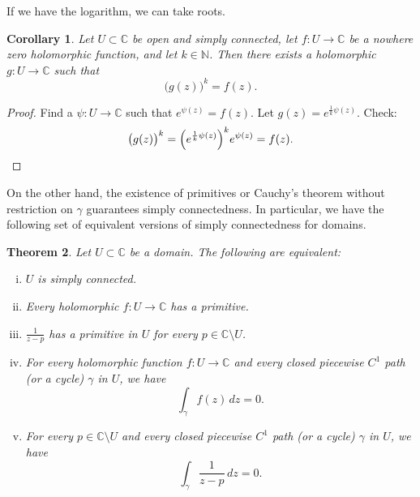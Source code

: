 \documentclass[12pt,openany]{book}
\newcommand{\C}{{\mathbb{C}}}
\newcommand{\N}{{\mathbb{N}}}
\theoremstyle{plain}
\newtheorem{thm}{Theorem}[section]
\newtheorem{cor}[thm]{Corollary}
\theoremstyle{remark}
\theoremstyle{definition}
\theoremstyle{exercise}
\theoremstyle{example}
\begin{document}
If we have the logarithm, we can take roots.

\begin{cor}
Let $U \subset \C$ be open and simply connected,
let $f \colon U \to \C$ be a nowhere zero holomorphic
function, and let $k \in \N$.
Then there exists a holomorphic $g \colon U \to \C$
such that
\begin{equation*}
{\bigl(g(z)\bigr)}^k = f(z) .
\end{equation*}
\end{cor}

\begin{proof}
Find a $\psi \colon U \to \C$ such that $e^{\psi(z)} = f(z)$.  Let
$g(z) = e^{\frac{1}{k} \psi(z)}$.  Check:
\begin{equation*}
{\bigl(g(z)\bigr)}^k
=
{\left( e^{\frac{1}{k} \psi(z)} \right)}^k
e^{\psi(z)} = f(z) . \qedhere
\end{equation*}
\end{proof}

On the other hand, the existence of primitives or
Cauchy's theorem without restriction on $\gamma$ guarantees simply
connectedness.  In particular, we have the following set of equivalent
versions of simply connectedness for domains.

\begin{thm}
Let $U \subset \C$ be a domain.  The following are equivalent:
\begin{enumerate}[(i)]
\item \label{thm:simplyconnected:i}
$U$ is simply connected.
\item \label{thm:simplyconnected:ii}
Every holomorphic $f \colon U \to \C$ has a primitive.
\item \label{thm:simplyconnected:iii}
$\frac{1}{z-p}$ has a primitive in $U$ for every $p \in \C \setminus U$.
\item \label{thm:simplyconnected:iv}
For every holomorphic function $f \colon U \to \C$ and every
closed
piecewise $C^1$ path (or a cycle) $\gamma$ in $U$, we have
\begin{equation*}
\int_\gamma f(z) \, dz = 0 .
\end{equation*}
\item \label{thm:simplyconnected:v}
For every $p \in \C \setminus U$ and every
closed
piecewise $C^1$ path (or a cycle) $\gamma$ in $U$, we have
\begin{equation*}
\int_\gamma \frac{1}{z-p} \, dz = 0 .
\end{equation*}
\end{enumerate}
\end{thm}
\end{document}
